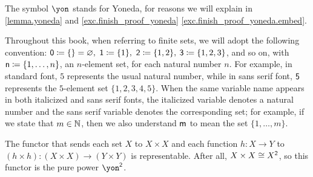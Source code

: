 \documentclass[Book-Poly]{subfiles}
\begin{document}
The symbol $\yon$ stands for Yoneda, for reasons we will explain in \cref{lemma.yoneda} and \cref{exc.finish_proof_yoneda} \cref{exc.finish_proof_yoneda.embed}.

Throughout this book, when referring to finite sets, we will adopt the following convention: $\textsf{0}\coloneqq\{\}=\varnothing,$ $\textsf{1}\coloneqq\{1\},$ $\textsf{2}\coloneqq\{1,2\},$ $\textsf{3}\coloneqq\{1,2,3\}$, and so on, with $\mathsf{n}\coloneqq\{1,\ldots,n\}$, an $n$-element set, for each natural number $n$.
For example, in standard font, $5$ represents the usual natural number, while in sans serif font, $\textsf{5}$ represents the $5$-element set $\{1,2,3,4,5\}$.
When the same variable name appears in both italicized and sans serif fonts, the italicized variable denotes a natural number and the sans serif variable denotes the corresponding set; for example, if we state that $m\in\mathbb{N}$, then we also understand $\mathsf{m}$ to mean the set $\{1,\ldots,m\}$.

\begin{example}
    The functor that sends each set $X$ to $X\times X$ and each function $h\colon X\to Y$ to $(h\times h)\colon (X\times X)\to(Y\times Y)$ is representable.
    After all, $X\times X \cong X^{\textsf{2}}$, so this functor is the pure power $\yon^\2$.
\end{example}
\end{document}
